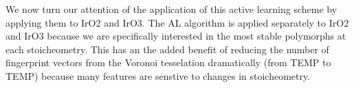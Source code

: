 




%
%
We now turn our attention of the application of this active learning scheme by applying them to IrO2 and IrO3.
The AL algorithm is applied separately to IrO2 and IrO3 because we are specifically interested in the most stable polymorphs at each stoicheometry.
This has an the added benefit of reducing the number of fingerprint vectors from the Voronoi tesselation dramatically (from TEMP to TEMP) because many features are senstive to changes in stoicheometry.


